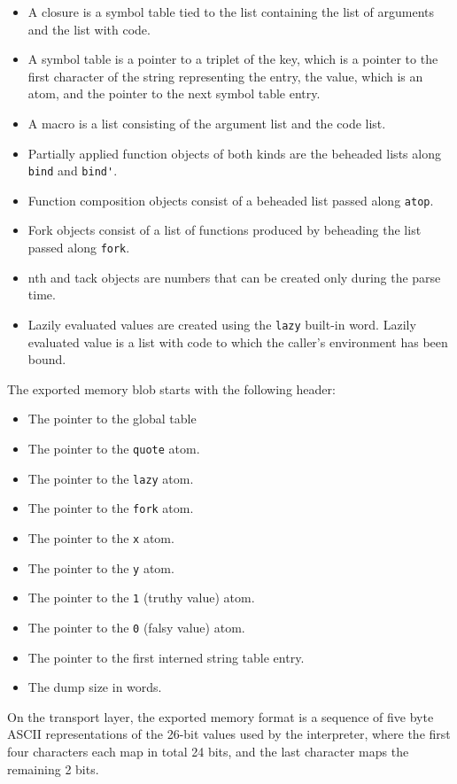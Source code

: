 \begin{itemize}
    \item A closure is a symbol table tied to the list containing the list of arguments and the list with code.
    \item A symbol table is a pointer to a triplet of the key, which is a pointer to the first character of the string representing the entry, the value, which is an atom, and the pointer to the next symbol table entry.
    \item A macro is a list consisting of the argument list and the code list.
    \item Partially applied function objects of both kinds are the beheaded lists along \verb|bind| and \verb|bind'|.
    \item Function composition objects consist of a beheaded list passed along \verb|atop|.
    \item Fork objects consist of a list of functions produced by beheading the list passed along \verb|fork|.
    \item nth and tack objects are numbers that can be created only during the parse time.
    \item Lazily evaluated values are created using the \verb|lazy| built-in word. Lazily evaluated value is a list with code to which the caller's environment has been bound.
\end{itemize}

\par The exported memory blob starts with the following header:

\begin{itemize}
    \item The pointer to the global table
    \item The pointer to the \verb|quote| atom.
    \item The pointer to the \verb|lazy| atom.
    \item The pointer to the \verb|fork| atom.
    \item The pointer to the \verb|x| atom.
    \item The pointer to the \verb|y| atom.
    \item The pointer to the \verb|1| (truthy value) atom.
    \item The pointer to the \verb|0| (falsy value) atom.
    \item The pointer to the first interned string table entry.
    \item The dump size in words.
\end{itemize}

\par On the transport layer, the exported memory format is a sequence of five byte ASCII representations of the 26-bit values used by the interpreter, where the first four characters each map in total 24 bits, and the last character maps the remaining 2 bits.

